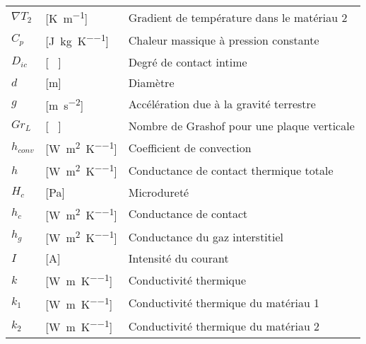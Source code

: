 \begin{longtable}{l p{2.5cm} p{4in}}
	$\nabla T_2$      & [\si{\kelvin\per\metre}]                            & Gradient de température dans le matériau 2                   \\
	$C_p$             & [\si{\joule\per\kilogram\per\kelvin}]               & Chaleur massique à pression constante                        \\
	$D_{ic}$          & [ \ ]                                               & Degré de contact intime                                      \\
	$d$               & [\si{\metre}]                                       & Diamètre                                                     \\
	$g$               & [\si{\metre\per\square\second}]                     & Accélération due à la gravité terrestre                      \\
	$Gr_L$            & [ \ ]                                               & Nombre de Grashof pour une plaque verticale                  \\
	$h_{conv}$        & [\si{\watt\per\square\metre\per\kelvin}]            & Coefficient de convection                                    \\
	$h$               & [\si{\watt\per\square\metre\per\kelvin}]            & Conductance de contact thermique totale                      \\
	$H_c$             & [\si{\pascal}]                                      & Microdureté                                                  \\
	$h_c$             & [\si{\watt\per\square\metre\per\kelvin}]            & Conductance de contact                                       \\
	$h_g$             & [\si{\watt\per\square\metre\per\kelvin}]            & Conductance du gaz interstitiel                              \\
	$I$               & [\si{\ampere}]                                      & Intensité du courant                                         \\
	$k$               & [\si{\watt\per\metre\per\kelvin}]                   & Conductivité thermique                                       \\
	$k_1$             & [\si{\watt\per\metre\per\kelvin}]                   & Conductivité thermique du matériau 1                         \\
	$k_2$             & [\si{\watt\per\metre\per\kelvin}]                   & Conductivité thermique du matériau 2                         \\

\end{longtable}
